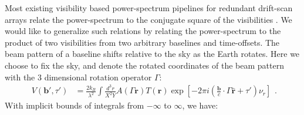 \documentclass[twocolumn,apj,numberedappendix]{emulateapj}
\renewcommand\[{\begin{equation}}
\renewcommand\]{\end{equation}}
\begin{document}
Most existing visibility based power-spectrum pipelines for redundant drift-scan  arrays relate the power-spectrum to the conjugate square of the visibilities \citep{first-paper, paper32, Ali2015}. We would like to generalize such relations by relating the power-spectrum to the product of two visibilities from two arbitrary baselines and time-offsets. 
The beam pattern of a baseline shifts relative to the sky as the Earth rotates. Here we choose to fix the sky, and denote the rotated coordinates
of the beam pattern with the 3 dimensional rotation operator $\Gamma$:
\small
\[
\begin{aligned}V(\boldsymbol{b'},\tau') & =\frac{2k_{B}}{\lambda^{2}}\int\frac{d^{3}r}{X^{2}Y}A(\Gamma\boldsymbol{r})T(\boldsymbol{r})\exp\left[-2\pi i\left(\frac{\boldsymbol{b}}{c}\cdot\Gamma\hat{\boldsymbol{r}}+\tau'\right)\nu_{r}\right]\end{aligned}.
\]
\normalsize
With implicit bounds of integrals from $-\infty$ to $\infty$, we have:
\end{document}
